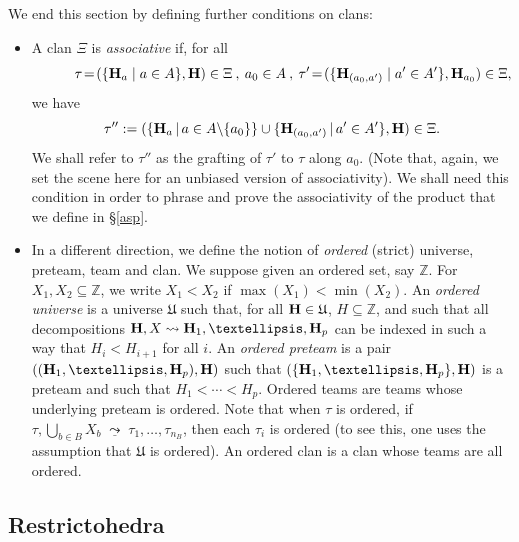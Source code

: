 \documentclass[11pt]{article}
\theoremstyle{definition}
\numberwithin{equation}{section}
\numberwithin{equation}{section}
\newcommand{\uline}[1]{\underline{#1}}
\newcommand{\inc}{\subseteq}
\newcommand{\set}[1]{\{#1\}}
\newcommand{\setc}[2]{\set{#1 \mid #2}}
\newcommand{\Union}{\bigcup}		%
\newcommand{\hyper}[1]{{\bf #1}}
\newcommand{\clandec}{\;\uline{\leadsto}\;}
\begin{document}
 
 We end this section by defining  further conditions on clans:
 \begin{itemize}
 \item  A clan  $\Xi$ is  {\em associative} if,
for all $$\quad\quad\quad\tau \!=\! (\setc{\hyper{H}_a}{a\in A},\hyper{H})\in \Xi\:,\:a_0\in A\: ,\:
\tau' \!=\! (\setc{\hyper{H}_{(a_0,a')}}{a'\in A'},\hyper{H}_{a_0}) \in\Xi,$$ we have
$$\tau'':=(\{{\bf H}_{a}\,|\,a\in A\backslash \{a_0\}\}\cup \{\hyper{H}_{(a_0,a')}\,|\,a'\in A'\},{\bf H})\in\Xi.$$ We shall refer to  $\tau''$ as the grafting of $\tau'$ to  $\tau$ along $a_0$.   (Note that, again, we set the scene here for an unbiased version of associativity). We shall need this condition in order to phrase and prove the associativity of the product that we define in \S\ref{asp}.
\item In a different direction, we define the notion of {\em ordered} (strict) universe, preteam, team and clan. We suppose given an ordered set, say $\mathbb{Z}$. For $X_1,X_2\inc\mathbb{Z}$, we write $X_1<X_2$ if $\max(X_1)<\min(X_2)$.  An \emph{ordered universe} is a universe $\mathfrak{U}$ such that, for all $\hyper{H}\in\mathfrak{U}$, $H\inc\mathbb{Z}$,  and such that  all decompositions 
$\hyper{H},X\leadsto \hyper{H}_1,\ldots,\hyper{H}_p$ can be indexed in such a way that $H_i<H_{i+1}$ for all $i$.  An \emph{ordered preteam} is a pair $((\hyper{H}_1,\ldots,\hyper{H}_p),\hyper{H})$ such that $(\set{\hyper{H}_1,\ldots,\hyper{H}_p},\hyper{H})$ is a preteam and such that $H_1<\cdots<H_p$. Ordered teams are teams whose underlying preteam is ordered. Note that when $\tau$ is ordered, if $\tau,\Union_{b\in B}X_b\clandec \tau_1,\ldots,\tau_{n_B}$, then each $\tau_i$  is ordered (to see this, one uses the assumption that $\mathfrak{U}$ is ordered).
An ordered clan is a clan whose teams are all ordered. 
\end{itemize}



\subsection{Restrictohedra} \label{restrictohedra-section}
\end{document}
